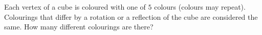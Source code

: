Each vertex of a cube is coloured with one of $5$ colours (colours may repeat). Colourings that differ by a rotation or a reflection of the cube are considered the same. How many different colourings are there?
